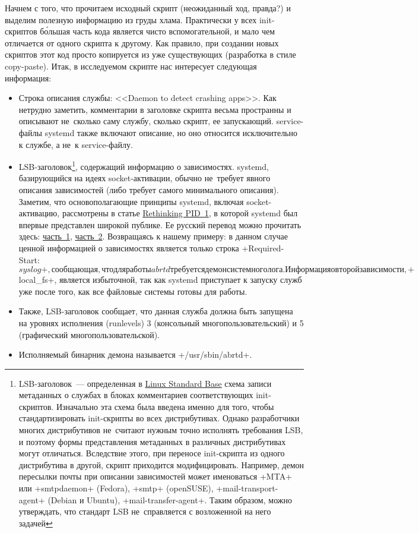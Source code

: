 \documentclass[10pt,oneside,a4paper]{article}
\begin{document}
Начнем с того, что прочитаем исходный скрипт (неожиданный ход, правда?) и
выделим полезную информацию из груды хлама. Практически у всех init-скриптов
б\'{о}льшая часть кода является чисто вспомогательной, и мало чем отличается от
одного скрипта к другому. Как правило, при создании новых скриптов этот код
просто копируется из уже существующих (разработка в стиле copy-paste). Итак,
в исследуемом скрипте нас интересует следующая информация: 

\begin{itemize}
	\item Строка описания службы: <<Daemon to detect crashing apps>>. Как
		нетрудно заметить, комментарии в заголовке скрипта весьма
		пространны и описывают не~сколько саму службу, сколько
		скрипт, ее запускающий. service-файлы systemd также включают
		описание, но оно относится исключительно к службе, а не~к
		service-файлу. 
	\item LSB-заголовок\footnote{LSB-заголовок~--- определенная в
		\href{http://refspecs.freestandards.org/LSB_3.1.1/LSB-Core-generic/LSB-Core-generic/initscrcomconv.html}{Linux
		Standard Base} схема записи метаданных о службах в блоках
		комментариев соответствующих init-скриптов. Изначально эта
		схема была введена именно для того, чтобы стандартизировать
		init-скрипты во всех дистрибутивах. Однако разработчики
		многих дистрибутивов не~считают нужным точно исполнять
		требования LSB, и поэтому формы представления метаданных в
		различных дистрибутивах могут отличаться. Вследствие этого,
		при переносе init-скрипта из одного дистрибутива в другой,
		скрипт приходится модифицировать. Например, демон пересылки
		почты при описании зависимостей может именоваться
		+MTA+ или +smtpdaemon+ (Fedora), +smtp+
		(openSUSE), +mail-transport-agent+ (Debian и Ubuntu),
		+mail-transfer-agent+. Таким образом, можно утверждать, что
		стандарт LSB не~справляется с возложенной на него задачей},
		содержащий информацию о зависимостях.  systemd, базирующийся
		на идеях socket-активации, обычно не~требует явного описания
		зависимостей (либо требует самого минимального описания).
		Заметим, что основополагающие принципы systemd, включая
		socket-активацию, рассмотрены в статье
		\href{http://0pointer.de/blog/projects/systemd.html}{Rethinking
		PID~1}, в которой systemd был впервые представлен широкой
		публике. Ее русский перевод можно прочитать здесь:
		\href{http://tux-the-penguin.blogspot.com/2010/09/systemd.html}{часть~1},
		\href{http://tux-the-penguin.blogspot.com/2010/09/systemd-ii.html}{часть~2}.
		Возвращаясь к нашему примеру: в данном случае ценной
		информацией о зависимостях является только строка
		+Required-Start: $syslog+, сообщающая, что для работы
		abrtd требуется демон системного лога.  Информация о второй
		зависимости, +$local_fs+, является избыточной, так как
		systemd приступает к запуску служб уже после того, как все
		файловые системы готовы для работы. 
	\item Также, LSB-заголовок сообщает, что данная служба должна быть
		запущена на уровнях исполнения (runlevels) 3 (консольный
		многопользовательский) и 5 (графический
		многопользовательской).
	\item Исполняемый бинарник демона называется +/usr/sbin/abrtd+. 
\end{itemize}
\end{document}
